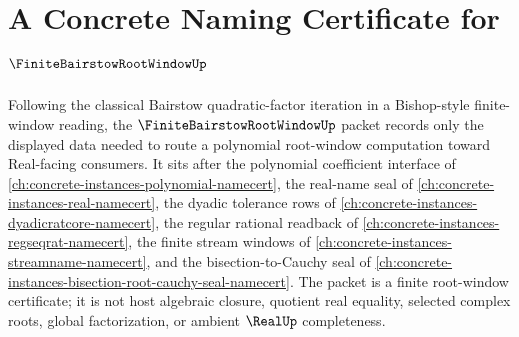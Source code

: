 \chapter{A Concrete Naming Certificate for $\FiniteBairstowRootWindowUp$}
\label{ch:concrete-instances-finite-bairstow-root-window-namecert}

Following the classical Bairstow quadratic-factor iteration in a Bishop-style finite-window reading, the $\FiniteBairstowRootWindowUp$ packet records only the displayed data needed to route a polynomial root-window computation toward Real-facing consumers. It sits after the polynomial coefficient interface of \autoref{ch:concrete-instances-polynomial-namecert}, the real-name seal of \autoref{ch:concrete-instances-real-namecert}, the dyadic tolerance rows of \autoref{ch:concrete-instances-dyadicratcore-namecert}, the regular rational readback of \autoref{ch:concrete-instances-regseqrat-namecert}, the finite stream windows of \autoref{ch:concrete-instances-streamname-namecert}, and the bisection-to-Cauchy seal of \autoref{ch:concrete-instances-bisection-root-cauchy-seal-namecert}. The packet is a finite root-window certificate; it is not host algebraic closure, quotient real equality, selected complex roots, global factorization, or ambient $\RealUp$ completeness.

